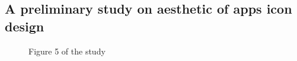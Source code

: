\documentclass[a4paper,11pt] {article}
\theoremstyle{definition}
\begin{document}
    \subsection{A preliminary study on aesthetic of apps icon design\cite{jpAnalitics}}
      \begin{figure}[H]
        \caption{Figure 5 of the study}\label{jpfig5}
      \end{figure}
\end{document}
